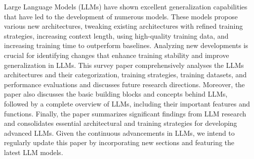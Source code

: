 
Large Language Models (LLMs) have shown excellent generalization capabilities that have led to the development of numerous models. These models propose various new architectures, tweaking existing architectures with refined training strategies, increasing context length, using high-quality training data, and increasing training time to outperform baselines. Analyzing new developments is crucial for identifying changes that enhance training stability and improve generalization in LLMs. This survey paper comprehensively analyses the LLMs architectures and their categorization, training strategies, training datasets, and performance evaluations and discusses future research directions. Moreover, the paper also discusses the basic building blocks and concepts behind LLMs, followed by a complete overview of LLMs, including their important features and functions. Finally, the paper summarizes significant findings from LLM research and consolidates essential architectural and training strategies for developing advanced LLMs. Given the continuous advancements in LLMs, we intend to regularly update this paper by incorporating new sections and featuring the latest LLM models.